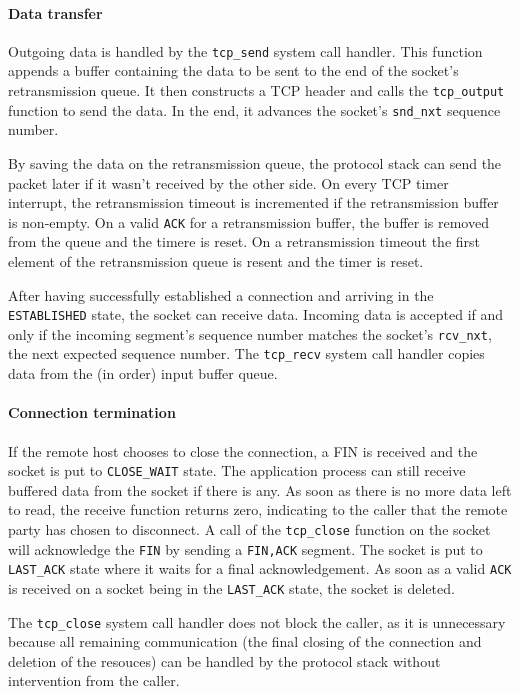\documentclass[11pt,twoside,abstract,notitlepage]{scrreprt}
\begin{document}
\paragraph{Data transfer}
Outgoing data is handled by the \texttt{tcp\_send} system call handler. This function appends a buffer containing the data to be sent to the end of the socket's retransmission queue. It then constructs a TCP header and calls the \texttt{tcp\_output} function to send the data. In the end, it advances the socket's \texttt{snd\_nxt} sequence number. 

By saving the data on the retransmission queue, the protocol stack can send the packet later if it wasn't received by the other side. On every TCP timer interrupt, the retransmission timeout is incremented if the retransmission buffer is non-empty. On a valid \texttt{ACK} for a retransmission buffer, the buffer is removed from the queue and the timere is reset. On a retransmission timeout the first element of the retransmission queue is resent and the timer is reset.

After having successfully established a connection and arriving in the \texttt{ESTABLISHED} state, the socket can receive data. Incoming data is accepted if and only if the incoming segment's sequence number matches the socket's \texttt{rcv\_nxt}, the next expected sequence number. The \texttt{tcp\_recv} system call handler copies data from the (in order) input buffer queue. 

\paragraph{Connection termination} If the remote host chooses to close the connection, a FIN is received and the socket is put to \texttt{CLOSE\_WAIT} state. The application process can still receive buffered data from the socket if there is any. As soon as there is no more data left to read, the receive function returns zero, indicating to the caller that the remote party has chosen to disconnect. A call of the \texttt{tcp\_close} function on the socket will acknowledge the \texttt{FIN} by sending a \texttt{FIN,ACK} segment. The socket is put to \texttt{LAST\_ACK} state where it waits for a final acknowledgement. As soon as a valid \texttt{ACK} is received on a socket being in the \texttt{LAST\_ACK} state, the socket is deleted. 

The \texttt{tcp\_close} system call handler does not block the caller, as it is unnecessary because all remaining communication (the final closing of the connection and deletion of the resouces) can be handled by the protocol stack without intervention from the caller. 
\end{document}
